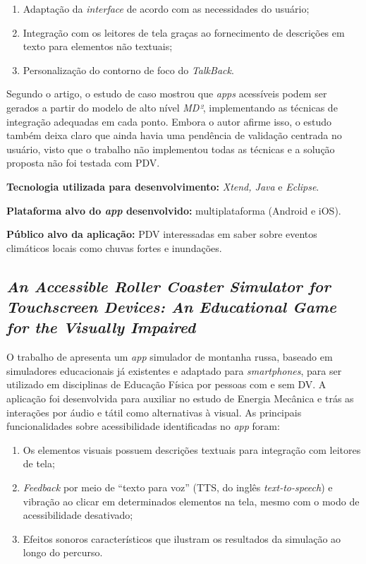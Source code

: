 \begin{enumerate}
    \item Adaptação da \emph{interface} de acordo com as necessidades do usuário;
    \item Integração com os leitores de tela graças ao fornecimento de descrições em texto para elementos não textuais;
    \item Personalização do contorno de foco do \emph{TalkBack}.
\end{enumerate}

Segundo o artigo, o estudo de caso mostrou que \emph{apps} acessíveis podem ser gerados a partir do modelo de alto nível \emph{MD²}, implementando as técnicas de integração adequadas em
cada ponto. Embora o autor afirme isso, o estudo também deixa claro que ainda havia uma pendência de validação centrada no usuário, visto que o trabalho não implementou todas as técnicas
e a solução proposta não foi testada com PDV\@.

\textbf{Tecnologia utilizada para desenvolvimento:} \emph{Xtend, Java} e \emph{Eclipse}.

\textbf{Plataforma alvo do \emph{app} desenvolvido:} multiplataforma (Android e iOS).

\textbf{Público alvo da aplicação:} PDV interessadas em saber sobre eventos climáticos locais como chuvas fortes e inundações.

\subsection{\emph{An Accessible Roller Coaster Simulator for Touchscreen Devices: An Educational Game for the Visually Impaired}}

O trabalho de  apresenta um \emph{app} simulador de montanha russa, baseado em simuladores educacionais já existentes
e adaptado para \emph{smartphones}, para ser utilizado em disciplinas de Educação Física por pessoas com e sem DV\@.
A aplicação foi desenvolvida para auxiliar no estudo de Energia Mecânica e trás as interações por áudio e tátil como alternativas à visual.
As principais funcionalidades sobre acessibilidade identificadas no \emph{app} foram:

\begin{enumerate}
    \item Os elementos visuais possuem descrições textuais para integração com leitores de tela;
    \item \emph{Feedback} por meio de ``texto para voz'' (TTS, do inglês \emph{text-to-speech}) e vibração ao clicar em determinados elementos
    na tela, mesmo com o modo de acessibilidade desativado;
    \item Efeitos sonoros característicos que ilustram os resultados da simulação ao longo do percurso.
\end{enumerate}

